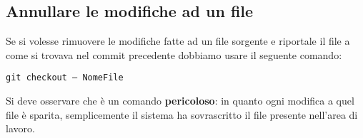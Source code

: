 \subsection{Annullare le modifiche ad un file}
Se si volesse rimuovere le modifiche fatte ad un file sorgente e riportale il file a come si trovava nel commit precedente dobbiamo usare il seguente comando:

\begin{center}
\texttt{git checkout -- NomeFile}
\end{center}

Si deve osservare che è un comando \textbf{pericoloso}: in quanto ogni modifica a quel file è sparita, semplicemente il sistema ha sovrascritto il file presente nell'area di lavoro.